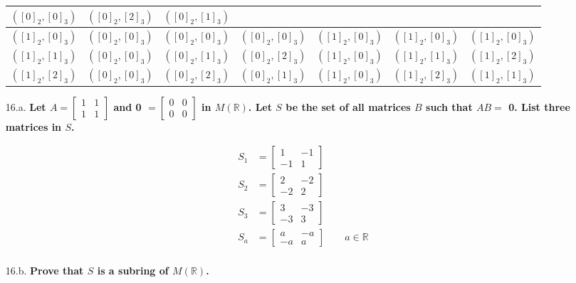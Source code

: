\documentclass{article}
\begin{document}
\begin{enumerate}
\begin{center}
\begin{tabular}{r || *{6}{c|} }
					$([0]_2, [0]_3)$ & $([0]_2, [2]_3)$ & $([0]_2, [1]_3)$ \\[0.3pt]\hline
					$([1]_2, [0]_3)$ & $([0]_2, [0]_3)$ & $([0]_2, [0]_3)$ & $([0]_2, [0]_3)$ & 
					$([1]_2, [0]_3)$ & $([1]_2, [0]_3)$ & $([1]_2, [0]_3)$ \\[0.3pt]\hline
					$([1]_2, [1]_3)$ & $([0]_2, [0]_3)$ & $([0]_2, [1]_3)$ & $([0]_2, [2]_3)$ & 
					$([1]_2, [0]_3)$ & $([1]_2, [1]_3)$ & $([1]_2, [2]_3)$ \\[0.3pt]\hline
					$([1]_2, [2]_3)$ & $([0]_2, [0]_3)$ & $([0]_2, [2]_3)$ & $([0]_2, [1]_3)$ & 
					$([1]_2, [0]_3)$ & $([1]_2, [2]_3)$ & $([1]_2, [1]_3)$ \\[0.3pt]\hline
				\end{tabular}
			\end{center}

		\item [16.a.] \textbf{Let 
						$A = \begin{bmatrix} 1 & 1 \\ 1 & 1 \end{bmatrix}$ and 
						0 $= \begin{bmatrix} 0 & 0 \\ 0 & 0 \end{bmatrix}$ in $M(\mathbb{R})$. Let 
						$S$ be the set of all matrices $B$ such that $AB = $ 0. List three matrices
						in $S$.}

			\begin{align*}
				S_1 & = \begin{bmatrix} 1 & -1 \\ -1 & 1 \end{bmatrix} \\
				S_2 & = \begin{bmatrix} 2 & -2 \\ -2 & 2 \end{bmatrix} \\
				S_3 & = \begin{bmatrix} 3 & -3 \\ -3 & 3 \end{bmatrix} \\
				S_a & = \begin{bmatrix} a & -a \\ -a & a \end{bmatrix} \qquad a \in \mathbb{R} \\
			\end{align*}
		\item [16.b.] \textbf{Prove that $S$ is a subring of $M(\mathbb{R})$.}


\end{enumerate}
\end{document}
